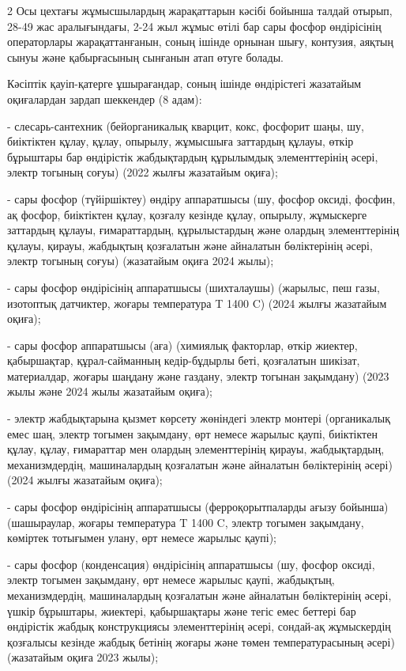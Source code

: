 \begin{multicols}{2}
Осы цехтағы жұмысшылардың жарақаттарын кәсібі бойынша талдай отырып,
28-49 жас аралығындағы, 2-24 жыл жұмыс өтілі бар сары фосфор өндірісінің
операторлары жарақаттанғанын, соның ішінде орнынан шығу, контузия,
аяқтың сынуы және қабырғасының сынғанын атап өтуге болады.

Кәсіптік қауіп-қатерге ұшырағандар, соның ішінде өндірістегі жазатайым
оқиғалардан зардап шеккендер (8 адам):

- слесарь-сантехник (бейорганикалық кварцит, кокс, фосфорит шаңы, шу,
биіктіктен құлау, құлау, опырылу, жұмысшыға заттардың құлауы, өткір
бұрыштары бар өндірістік жабдықтардың құрылымдық элементтерінің әсері,
электр тогының соғуы) (2022 жылғы жазатайым оқиға);

- сары фосфор (түйіршіктеу) өндіру аппаратшысы (шу, фосфор оксиді,
фосфин, ақ фосфор, биіктіктен құлау, қозғалу кезінде құлау, опырылу,
жұмыскерге заттардың құлауы, ғимараттардың, құрылыстардың және олардың
элементтерінің құлауы, қирауы, жабдықтың қозғалатын және айналатын
бөліктерінің әсері, электр тогының соғуы) (жазатайым оқиға 2024 жылы);

- сары фосфор өндірісінің аппаратшысы (шихталаушы) (жарылыс, пеш газы,
изотоптық датчиктер, жоғары температура T 1400 C)
(2024 жылғы жазатайым оқиға);

- сары фосфор аппаратшысы (аға) (химиялық факторлар, өткір жиектер,
қабыршақтар, құрал-сайманның кедір-бұдырлы беті, қозғалатын шикізат,
материалдар, жоғары шаңдану және газдану, электр тогынан зақымдану)
(2023 жылы және 2024 жылы жазатайым оқиға);

- электр жабдықтарына қызмет көрсету жөніндегі электр монтері
(органикалық емес шаң, электр тогымен зақымдану, өрт немесе жарылыс
қаупі, биіктіктен құлау, құлау, ғимараттар мен олардың элементтерінің
қирауы, жабдықтардың, механизмдердің, машиналардың қозғалатын және
айналатын бөліктерінің әсері) (2024 жылғы жазатайым оқиға);

- сары фосфор өндірісінің аппаратшысы (ферроқорытпаларды ағызу бойынша)
(шашыраулар, жоғары температура T 1400 C, электр
тогымен зақымдану, көміртек тотығымен улану, өрт немесе жарылыс қаупі);

- сары фосфор (конденсация) өндірісінің аппаратшысы (шу, фосфор оксиді,
электр тогымен зақымдану, өрт немесе жарылыс қаупі, жабдықтың,
механизмдердің, машиналардың қозғалатын және айналатын бөліктерінің
әсері, үшкір бұрыштары, жиектері, қабыршақтары және тегіс емес беттері
бар өндірістік жабдық конструкциясы элементтерінің әсері, сондай-ақ
жұмыскердің қозғалысы кезінде жабдық бетінің жоғары және төмен
температурасының әсері) (жазатайым оқиға 2023 жылы);


\end{multicols}

